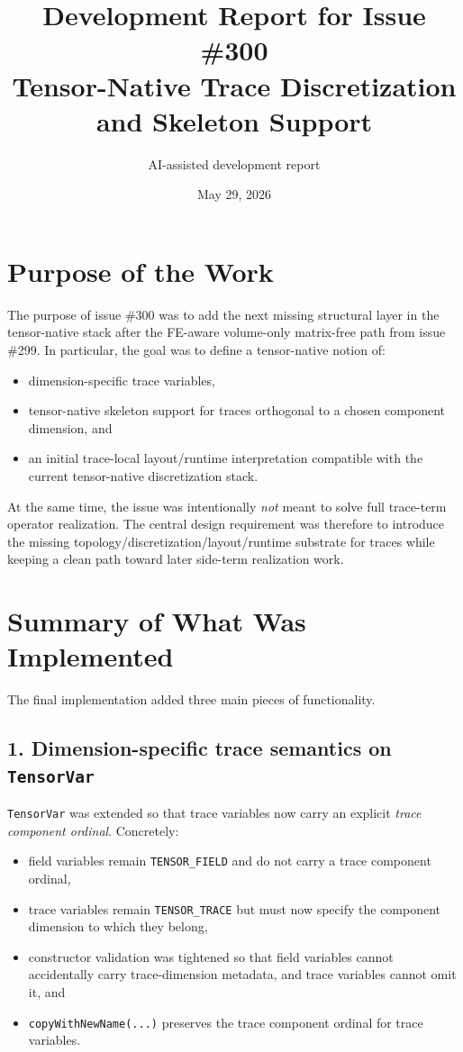 \documentclass[11pt]{article}
\title{Development Report for Issue \#300\\Tensor-Native Trace Discretization and Skeleton Support}
\author{AI-assisted development report}
\date{May 29, 2026}
\begin{document}
\maketitle

\section{Purpose of the Work}

The purpose of issue \#300 was to add the next missing structural layer in the tensor-native stack after the FE-aware volume-only matrix-free path from issue \#299. In particular, the goal was to define a tensor-native notion of:
\begin{itemize}[leftmargin=2em]
  \item dimension-specific trace variables,
  \item tensor-native skeleton support for traces orthogonal to a chosen component dimension, and
  \item an initial trace-local layout/runtime interpretation compatible with the current tensor-native discretization stack.
\end{itemize}

At the same time, the issue was intentionally \emph{not} meant to solve full trace-term operator realization. The central design requirement was therefore to introduce the missing topology/discretization/layout/runtime substrate for traces while keeping a clean path toward later side-term realization work.

\section{Summary of What Was Implemented}

The final implementation added three main pieces of functionality.

\subsection{1. Dimension-specific trace semantics on \texttt{TensorVar}}

\texttt{TensorVar} was extended so that trace variables now carry an explicit \emph{trace component ordinal}. Concretely:
\begin{itemize}[leftmargin=2em]
  \item field variables remain \texttt{TENSOR\_FIELD} and do not carry a trace component ordinal,
  \item trace variables remain \texttt{TENSOR\_TRACE} but must now specify the component dimension to which they belong,
  \item constructor validation was tightened so that field variables cannot accidentally carry trace-dimension metadata, and trace variables cannot omit it, and
  \item \texttt{copyWithNewName(...)} preserves the trace component ordinal for trace variables.
\end{itemize}
\end{document}
